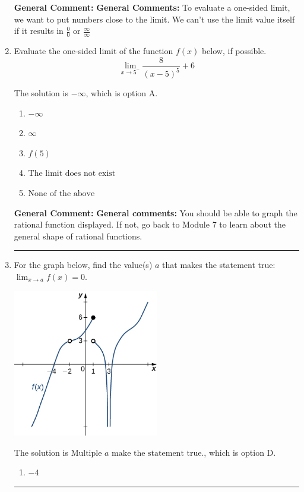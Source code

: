 \documentclass{extbook}[14pt]
\newcommand{\litem}[1]{\item #1

\rule{\textwidth}{0.4pt}}
\begin{document}
\begin{enumerate}
{\textbf{General Comment:} \textbf{General Comments:} To evaluate a one-sided limit, we want to put numbers close to the limit. We can't use the limit value itself if it results in $\frac{0}{0}$ or $\frac{\infty}{\infty}$
}
\litem{
Evaluate the one-sided limit of the function $f(x)$ below, if possible.
\[ \lim_{x \rightarrow 5^-} \frac{8}{(x-5)^5}+6 \]

The solution is \( -\infty \), which is option A.\begin{enumerate}[label=\Alph*.]
\item \( -\infty \)


\item \( \infty \)


\item \( f(5) \)


\item \( \text{The limit does not exist} \)


\item \( \text{None of the above} \)


\end{enumerate}

\textbf{General Comment:} \textbf{General comments:} You should be able to graph the rational function displayed. If not, go back to Module 7 to learn about the general shape of rational functions.
}
\litem{
For the graph below, find the value(s) $a$ that makes the statement true: $ \displaystyle \lim_{x \rightarrow a} f(x) = 0$.

\begin{center}
    \includegraphics[width=0.5\textwidth]{../Figures/evaluateLimitGraphicallyCopyB.png}
\end{center}




The solution is \( \text{Multiple } a \text{ make the statement true}. \), which is option D.\begin{enumerate}[label=\Alph*.]
\item \( -4 \)



\end{enumerate}}
\end{enumerate}
\end{document}
